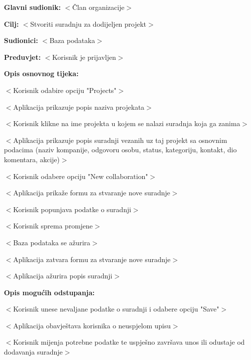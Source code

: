 					\noindent {}
					\begin{packed_item}

						\item \textbf{Glavni sudionik:} $<$Član organizacije$>$
						\item \textbf{Cilj:} $<$Stvoriti suradnju za dodijeljen projekt$>$
						\item \textbf{Sudionici:} $<$Baza podataka$>$
						\item \textbf{Preduvjet:} $<$Korisnik je prijavljen$>$
						\item \textbf{Opis osnovnog tijeka:}

						\item[] \begin{packed_enum}

							\item $<$Korisnik odabire opciju "Projects"$>$
							\item $<$Aplikacija prikazuje popis naziva projekata$>$
							\item $<$Korisnik klikne na ime projekta u kojem se nalazi suradnja koja ga zanima$>$
							\item $<$Aplikacija prikazuje popis suradnji vezanih uz taj projekt sa osnovnim podacima (naziv kompanije, odgovoru osobu, status, kategoriju, kontakt, dio komentara, akcije)$>$
							\item $<$Korisnik odabere opciju "New collaboration"$>$
							\item $<$Aplikacija prikaže formu za stvaranje nove suradnje$>$
							\item $<$Korisnik popunjava podatke o suradnji$>$
							\item $<$Korisnik sprema promjene$>$
							\item $<$Baza podataka se ažurira$>$
							\item $<$Aplikacija zatvara formu za stvaranje nove suradnje$>$
							\item $<$Aplikacija ažurira popis suradnji$>$
						\end{packed_enum}

						\item \textbf{Opis mogućih odstupanja:}

						\item[] \begin{packed_item}

							\item[8.c] $<$Korisnik unese nevaljane podatke o suradnji i odabere opciju "Save"$>$
							\item[] \begin{packed_enum}

								\item $<$Aplikacija obavještava korisnika o neuspjelom upisu$>$
								\item $<$Korisnik mijenja potrebne podatke te uspješno završava unos ili
								odustaje od dodavanja suradnje$>$

							\end{packed_enum}

						\end{packed_item}
					\end{packed_item}

